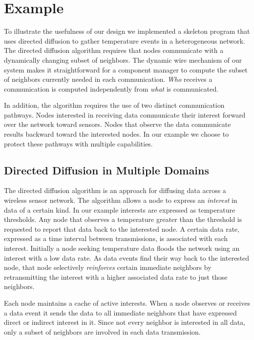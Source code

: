 \section{Example}
\label{section-example}

To illustrate the usefulness of our design we implemented a skeleton program that uses directed
diffusion to gather temperature events in a heterogeneous network. The directed diffusion
algorithm requires that nodes communicate with a dynamically changing subset of neighbors. The
dynamic wire mechanism of our system makes it straightforward for a component manager to compute
the subset of neighbors currently needed in each communication. \emph{Who} receives a
communication is computed independently from \emph{what} is communicated.

In addition, the algorithm requires the use of two distinct communication pathways. Nodes
interested in receiving data communicate their interest forward over the network toward sensors.
Nodes that observe the data communicate results backward toward the interested nodes. In our
example we choose to protect these pathways with multiple capabilities.

\subsection{Directed Diffusion in Multiple Domains}

The directed diffusion algorithm \cite{intanagonwiwat-2003} is an approach for diffusing data
across a wireless sensor network. The algorithm allows a node to express an \emph{interest} in
data of a certain kind. In our example interests are expressed as temperature thresholds. Any
node that observes a temperature greater than the threshold is requested to report that data
back to the interested node. A certain data rate, expressed as a time interval between
transmissions, is associated with each interest. Initially a node seeking temperature data
floods the network using an interest with a low data rate. As data events find their way back to
the interested node, that node selectively \emph{reinforces} certain immediate neighbors by
retransmitting the interest with a higher associated data rate to just those neighbors.

Each node maintains a cache of active interests. When a node observes or receives a data event
it sends the data to all immediate neighbors that have expressed direct or indirect interest in
it. Since not every neighbor is interested in all data, only a subset of neighbors are involved
in each data transmission.

